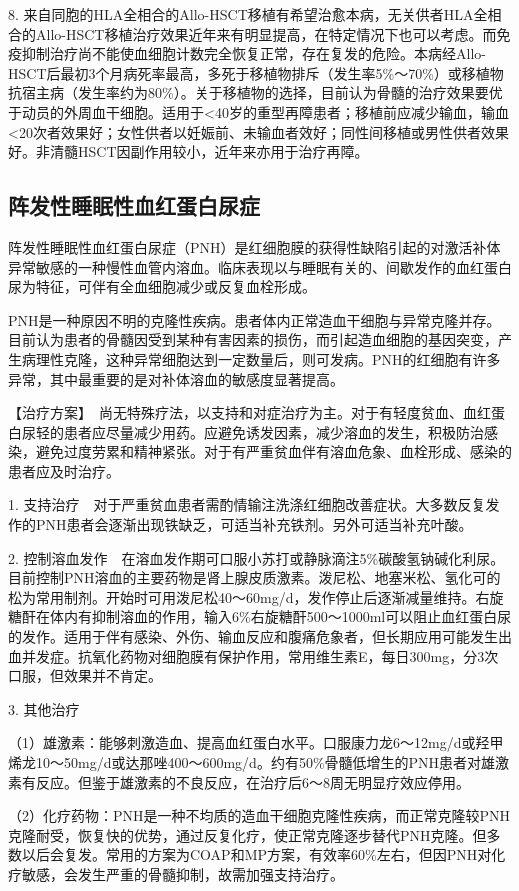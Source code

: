 8.
来自同胞的HLA全相合的Allo-HSCT移植有希望治愈本病，无关供者HLA全相合的Allo-HSCT移植治疗效果近年来有明显提高，在特定情况下也可以考虑。而免疫抑制治疗尚不能使血细胞计数完全恢复正常，存在复发的危险。本病经Allo-HSCT后最初3个月病死率最高，多死于移植物排斥（发生率5\%～70\%）或移植物抗宿主病（发生率约为80\%）。关于移植物的选择，目前认为骨髓的治疗效果要优于动员的外周血干细胞。适用于<40岁的重型再障患者；移植前应减少输血，输血<20次者效果好；女性供者以妊娠前、未输血者效好；同性间移植或男性供者效果好。非清髓HSCT因副作用较小，近年来亦用于治疗再障。

\subsection{阵发性睡眠性血红蛋白尿症}

阵发性睡眠性血红蛋白尿症（PNH）是红细胞膜的获得性缺陷引起的对激活补体异常敏感的一种慢性血管内溶血。临床表现以与睡眠有关的、间歇发作的血红蛋白尿为特征，可伴有全血细胞减少或反复血栓形成。

PNH是一种原因不明的克隆性疾病。患者体内正常造血干细胞与异常克隆并存。目前认为患者的骨髓因受到某种有害因素的损伤，而引起造血细胞的基因突变，产生病理性克隆，这种异常细胞达到一定数量后，则可发病。PNH的红细胞有许多异常，其中最重要的是对补体溶血的敏感度显著提高。

【治疗方案】　尚无特殊疗法，以支持和对症治疗为主。对于有轻度贫血、血红蛋白尿轻的患者应尽量减少用药。应避免诱发因素，减少溶血的发生，积极防治感染，避免过度劳累和精神紧张。对于有严重贫血伴有溶血危象、血栓形成、感染的患者应及时治疗。

1.
支持治疗　对于严重贫血患者需酌情输注洗涤红细胞改善症状。大多数反复发作的PNH患者会逐渐出现铁缺乏，可适当补充铁剂。另外可适当补充叶酸。

2.
控制溶血发作　在溶血发作期可口服小苏打或静脉滴注5\%碳酸氢钠碱化利尿。目前控制PNH溶血的主要药物是肾上腺皮质激素。泼尼松、地塞米松、氢化可的松为常用制剂。开始时可用泼尼松40～60mg/d，发作停止后逐渐减量维持。右旋糖酐在体内有抑制溶血的作用，输入6\%右旋糖酐500～1000ml可以阻止血红蛋白尿的发作。适用于伴有感染、外伤、输血反应和腹痛危象者，但长期应用可能发生出血并发症。抗氧化药物对细胞膜有保护作用，常用维生素E，每日300mg，分3次口服，但效果并不肯定。

3. 其他治疗

（1）雄激素：能够刺激造血、提高血红蛋白水平。口服康力龙6～12mg/d或羟甲烯龙10～50mg/d或达那唑400～600mg/d。约有50\%骨髓低增生的PNH患者对雄激素有反应。但鉴于雄激素的不良反应，在治疗后6～8周无明显疗效应停用。

（2）化疗药物：PNH是一种不均质的造血干细胞克隆性疾病，而正常克隆较PNH克隆耐受，恢复快的优势，通过反复化疗，使正常克隆逐步替代PNH克隆。但多数以后会复发。常用的方案为COAP和MP方案，有效率60\%左右，但因PNH对化疗敏感，会发生严重的骨髓抑制，故需加强支持治疗。

